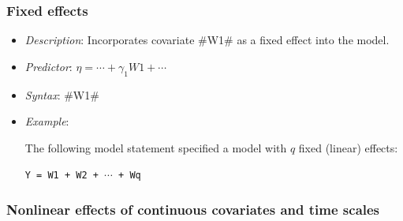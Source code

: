 \subsubsection*{Fixed effects}

\begin{itemize}
\item[] {\em Description}: Incorporates covariate #W1# as a fixed effect into the model.
\item[] {\em Predictor}: $\eta =  \cdots + \gamma_1 W1 + \cdots$
\item[] {\em Syntax}: #W1#
\item[] {\em Example}:

The following model statement specified a model with $q$ fixed
(linear) effects:

\texttt{Y = W1 + W2 + $\cdots$ + Wq}
\end{itemize}

\subsubsection*{Nonlinear effects of continuous covariates and time
scales}


